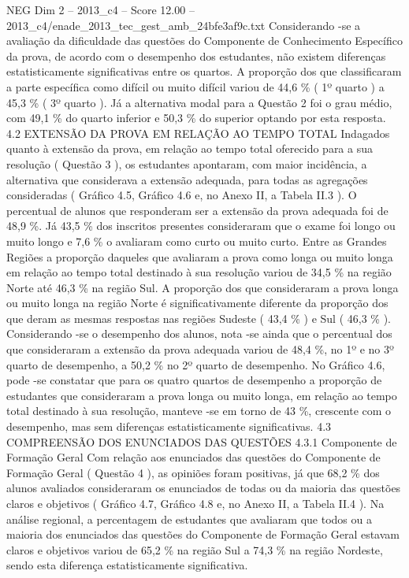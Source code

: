 \begin{textsample}{NEG Dim 2 – 2013\_c4 – Score 12.00 – 2013\_c4/enade\_2013\_tec\_gest\_amb\_24bfe3af9c.txt}
Considerando -se a avaliação da dificuldade das questões do Componente de Conhecimento Específico da prova, de acordo com o desempenho dos estudantes, não existem diferenças estatisticamente significativas entre os quartos.
A proporção dos que classificaram a parte específica como difícil ou muito difícil variou de 44,6 \% ( 1º quarto ) a 45,3 \% ( 3º quarto ).
Já a alternativa modal para a Questão 2 foi o grau médio, com 49,1 \% do quarto inferior e 50,3 \% do superior optando por esta resposta. 4.2 EXTENSÃO DA PROVA EM RELAÇÃO AO TEMPO TOTAL Indagados quanto à extensão da prova, em relação ao tempo total oferecido para a sua resolução ( Questão 3 ), os estudantes apontaram, com maior incidência, a alternativa que considerava a extensão adequada, para todas as agregações consideradas ( Gráfico 4.5, Gráfico 4.6 e, no Anexo II, a Tabela II.3 ).
O percentual de alunos que responderam ser a extensão da prova adequada foi de 48,9 \%.
Já 43,5 \% dos inscritos presentes consideraram que o exame foi longo ou muito longo e 7,6 \% o avaliaram como curto ou muito curto.
Entre as Grandes Regiões a proporção daqueles que avaliaram a prova como longa ou muito longa em relação ao tempo total destinado à sua resolução variou de 34,5 \% na região Norte até 46,3 \% na região Sul.
A proporção dos que consideraram a prova longa ou muito longa na região Norte é significativamente diferente da proporção dos que deram as mesmas respostas nas regiões Sudeste ( 43,4 \% ) e Sul ( 46,3 \% ).
Considerando -se o desempenho dos alunos, nota -se ainda que o percentual dos que consideraram a extensão da prova adequada variou de 48,4 \%, no 1º e no 3º quarto de desempenho, a 50,2 \% no 2º quarto de desempenho.
No Gráfico 4.6, pode -se constatar que para os quatro quartos de desempenho a proporção de estudantes que consideraram a prova longa ou muito longa, em relação ao tempo total destinado à sua resolução, manteve -se em torno de 43 \%, crescente com o desempenho, mas sem diferenças estatisticamente significativas. 4.3 COMPREENSÃO DOS ENUNCIADOS DAS QUESTÕES 4.3.1 Componente de Formação Geral Com relação aos enunciados das questões do Componente de Formação Geral ( Questão 4 ), as opiniões foram positivas, já que 68,2 \% dos alunos avaliados consideraram os enunciados de todas ou da maioria das questões claros e objetivos ( Gráfico 4.7, Gráfico 4.8 e, no Anexo II, a Tabela II.4 ).
Na análise regional, a percentagem de estudantes que avaliaram que todos ou a maioria dos enunciados das questões do Componente de Formação Geral estavam claros e objetivos variou de 65,2 \% na região Sul a 74,3 \% na região Nordeste, sendo esta diferença estatisticamente significativa.

\end{textsample}
